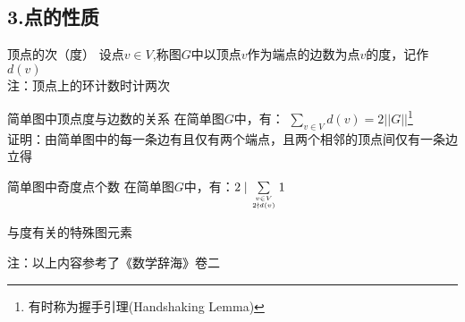 \subsection{3.点的性质}
\begin{definition}{顶点的次（度）}
设点$v \in V$,称图$G$中以顶点$v$作为端点的边数为点$v$的度，记作$d(v)$
\\注：顶点上的环计数时计两次
\end{definition}
\begin{theorem}{简单图中顶点度与边数的关系}
在简单图$G$中，有：
$\sum_{v \in V}{d(v)}=2||G||$\footnote{有时称为握手引理(Handshaking Lemma)}
\\证明：由简单图中的每一条边有且仅有两个端点，且两个相邻的顶点间仅有一条边立得
\end{theorem}
\begin{corollary}{简单图中奇度点个数}
在简单图$G$中，有：$2\mid \sum\limits_{v\in V\atop 2\nmid d(v)}1$
\end{corollary}

\begin{definition}{与度有关的特殊图元素}

\end{definition}
注：以上内容参考了《数学辞海》卷二
